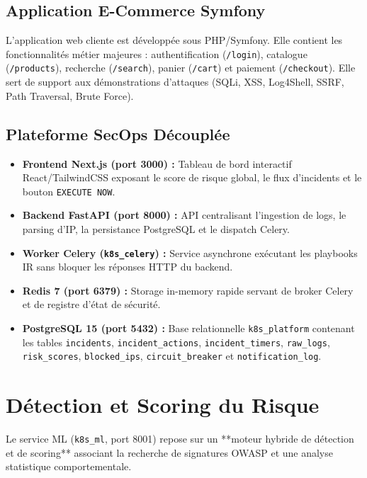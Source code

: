 \documentclass[12pt,a4paper]{report}
\begin{document}
\section{Application E-Commerce Symfony}
L'application web cliente est développée sous PHP/Symfony. Elle contient les fonctionnalités métier majeures : authentification (\texttt{/login}), catalogue (\texttt{/products}), recherche (\texttt{/search}), panier (\texttt{/cart}) et paiement (\texttt{/checkout}). Elle sert de support aux démonstrations d'attaques (SQLi, XSS, Log4Shell, SSRF, Path Traversal, Brute Force).

\section{Plateforme SecOps Découplée}
\begin{itemize}
    \item \textbf{Frontend Next.js (port 3000) :} Tableau de bord interactif React/TailwindCSS exposant le score de risque global, le flux d'incidents et le bouton \texttt{EXECUTE NOW}.
    \item \textbf{Backend FastAPI (port 8000) :} API centralisant l'ingestion de logs, le parsing d'IP, la persistance PostgreSQL et le dispatch Celery.
    \item \textbf{Worker Celery (\texttt{k8s\_celery}) :} Service asynchrone exécutant les playbooks IR sans bloquer les réponses HTTP du backend.
    \item \textbf{Redis 7 (port 6379) :} Storage in-memory rapide servant de broker Celery et de registre d'état de sécurité.
    \item \textbf{PostgreSQL 15 (port 5432) :} Base relationnelle \texttt{k8s\_platform} contenant les tables \texttt{incidents}, \texttt{incident\_actions}, \texttt{incident\_timers}, \texttt{raw\_logs}, \texttt{risk\_scores}, \texttt{blocked\_ips}, \texttt{circuit\_breaker} et \texttt{notification\_log}.
\end{itemize}

\chapter{Détection et Scoring du Risque}
Le service ML (\texttt{k8s\_ml}, port 8001) repose sur un **moteur hybride de détection et de scoring** associant la recherche de signatures OWASP et une analyse statistique comportementale.
\end{document}
